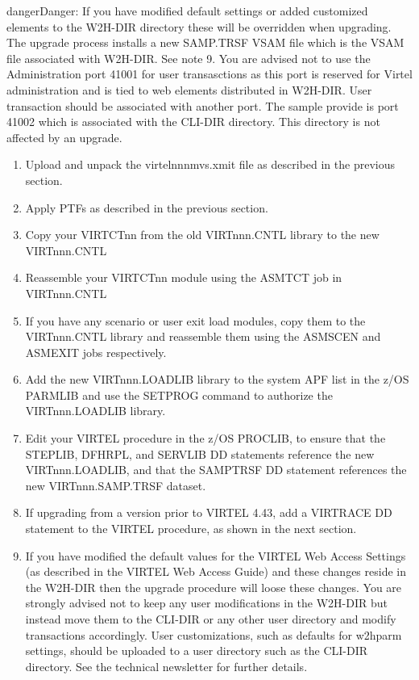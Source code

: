 \documentclass[letterpaper,10pt,english]{sphinxmanual}
\begin{document}
\begin{sphinxadmonition}{danger}{Danger:}
If you have modified default settings or added customized elements to the W2H-DIR directory these will be overridden when upgrading. The upgrade process installs a new SAMP.TRSF VSAM file which is the VSAM file associated with W2H-DIR. See note 9. You are advised not to use the Administration port 41001 for user transasctions as this port is reserved for Virtel administration and is tied to web elements distributed in W2H-DIR. User transaction should be associated with another port. The sample provide is port 41002 which is associated with the CLI-DIR directory. This directory is not affected by an upgrade.
\end{sphinxadmonition}
\begin{enumerate}
%
\item {} 
Upload and unpack the virtelnnnmvs.xmit file as described in the previous section.

\item {} 
Apply PTFs as described in the previous section.

\item {} 
Copy your VIRTCTnn from the old VIRTnnn.CNTL library to the new VIRTnnn.CNTL

\item {} 
Reassemble your VIRTCTnn module using the ASMTCT job in VIRTnnn.CNTL

\item {} 
If you have any scenario or user exit load modules, copy them to the VIRTnnn.CNTL library and reassemble them using the ASMSCEN and ASMEXIT jobs respectively.

\item {} 
Add the new VIRTnnn.LOADLIB library to the system APF list in the z/OS PARMLIB and use the SETPROG command to authorize the VIRTnnn.LOADLIB library.

\item {} 
Edit your VIRTEL procedure in the z/OS PROCLIB, to ensure that the STEPLIB, DFHRPL, and SERVLIB DD statements reference the new VIRTnnn.LOADLIB, and that the SAMPTRSF DD statement references the new VIRTnnn.SAMP.TRSF dataset.

\item {} 
If upgrading from a version prior to VIRTEL 4.43, add a VIRTRACE DD statement to the VIRTEL procedure, as shown in the next section.

\item {} 
If you have modified the default values for the VIRTEL Web Access Settings (as described in the VIRTEL Web Access Guide) and these changes reside in the W2H-DIR then the upgrade procedure will loose these changes. You are strongly advised not to keep any user modifications in the W2H-DIR but instead move them to the CLI-DIR or any other user directory and modify transactions accordingly. User customizations, such as defaults for w2hparm settings, should be uploaded to a user directory such as the CLI-DIR directory. See the technical newsletter  for further details.


\end{enumerate}
\end{document}
